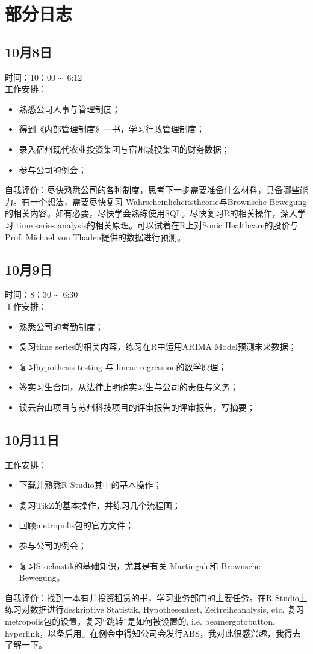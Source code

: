\documentclass[H:\workspace\实习日志\ShixiRizhi.tex]{subfiles}
\begin{document}
\section{部分日志}\label{appendix:a}
\subsection{10月8日}
时间：10：00 \textasciitilde \, 6:12\\
工作安排：
\begin{itemize}
    \item 熟悉公司人事与管理制度；
    \item 得到《内部管理制度》一书，学习行政管理制度；
    \item 录入宿州现代农业投资集团与宿州城投集团的财务数据；
    \item 参与公司的例会；
\end{itemize}
自我评价：尽快熟悉公司的各种制度，思考下一步需要准备什么材料，具备哪些能力。有一个想法，需要尽快复习
Wahrscheinlicheitstheorie与Brownsche Bewegung的相关内容。如有必要，尽快学会熟练使用SQL。尽快复习R的相关操作，深入学习
time series analysis的相关原理。可以试着在R上对Sonic Healthcare的股价与 Prof. Michael von Thaden提供的数据进行预测。

\subsection{10月9日}
时间：8：30 \textasciitilde \, 6:30\\
工作安排：
\begin{itemize}
    \item 熟悉公司的考勤制度；
    \item 复习time series的相关内容，练习在R中运用ARIMA Model预测未来数据；
    \item 复习hypothesis testing 与 linear regression的数学原理；
    \item 签实习生合同，从法律上明确实习生与公司的责任与义务；
    \item 读云台山项目与苏州科技项目的评审报告的评审报告，写摘要；
\end{itemize}

\subsection{10月11日}
工作安排：
\begin{itemize}
    \item 下载并熟悉R Studio其中的基本操作；
    \item 复习TikZ的基本操作，并练习几个流程图；
    \item 回顾metropolis包的官方文件；
    \item 参与公司的例会；
    \item 复习Stochastik的基础知识，尤其是有关 Martingale和 Brownsche Bewegung。
\end{itemize}
自我评价：找到一本有并投资租赁的书，学习业务部门的主要任务。在R Studio上练习对数据进行deskriptive Statistik, Hypothesentest, Zeitreiheanalysis, etc. 
复习metropolis包的设置，复习“跳转”是如何被设置的, i.e. beamergotobutton, hyperlink，以备后用。在例会中得知公司会发行ABS，我对此很感兴趣，我得去了解一下。
\end{document}
